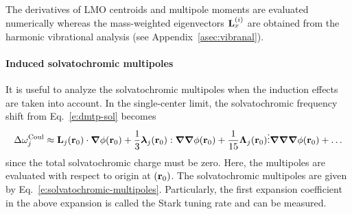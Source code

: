 \documentclass[a4paper,titlepage,twoside,fleqn,12pt]{book}
\newcommand{\BM}[1]{\bm{#1}}
\begin{document}
\begin{refsection}
The derivatives of LMO centroids and multipole moments are evaluated numerically whereas 
the mass\hyp{}weighted eigenvectors
${\bf L}_x^{(i)}$ 
are obtained from the harmonic vibrational analysis (see Appendix~\ref{asec:vibranal}).

\paragraph{Induced solvatochromic multipoles\label{p:solindmult}}
It is useful to analyze the solvatochromic multipoles 
when the induction effects are taken into account.
In the single\hyp{}center limit, the solvatochromic
frequency shift from Eq.~\eqref{e:dmtp-sol}
becomes
%
\begin{equation} \label{e:dmtp-solmmm}
 \Delta\omega_j^{\rm Coul} \approx  
                        {\bf L}_j({\bf r}_0) \cdot {\BM \nabla} \phi({\bf r}_0)   + 
      \frac{1}{3} {\BM \lambda}_j({\bf r}_0) : {\BM \nabla}  {\BM \nabla} \phi({\bf r}_0)   + 
     \frac{1}{15} {\BM \Lambda}_j({\bf r}_0) \vdots {\BM \nabla}  {\BM \nabla}  {\BM \nabla} \phi({\bf r}_0) + \ldots
\end{equation}
%
since the total solvatochromic charge must be zero. Here, the multipoles
are evaluated with respect to origin at $({\bf r}_0)$.
The solvatochromic multipoles are given by Eq.~\eqref{e:solvatochromic-multipoles}.
Particularly, the first expansion coefficient in the above expansion
is called the Stark tuning rate and can be measured.


\end{refsection}
\end{document}
